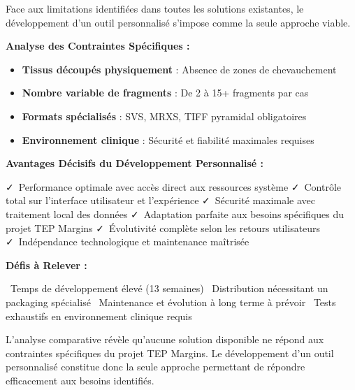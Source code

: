 \documentclass[11pt,a4paper]{report}
\newcommand{\pro}[1]{\textcolor{SuccessGreen}{\faCheck\ #1}}
\newcommand{\con}[1]{\textcolor{DangerRed}{\faTimes\ #1}}
\begin{document}
\begin{tcolorbox}[colback=SuccessGreen!10, colframe=SuccessGreen, title=Développement Personnalisé - Solution Optimale]

Face aux limitations identifiées dans toutes les solutions existantes, le développement d'un outil personnalisé s'impose comme la seule approche viable.

\vspace{0.5cm}

\textbf{Analyse des Contraintes Spécifiques :}
\begin{itemize}[leftmargin=*]
    \item \textbf{Tissus découpés physiquement} : Absence de zones de chevauchement
    \item \textbf{Nombre variable de fragments} : De 2 à 15+ fragments par cas
    \item \textbf{Formats spécialisés} : SVS, MRXS, TIFF pyramidal obligatoires
    \item \textbf{Environnement clinique} : Sécurité et fiabilité maximales requises
\end{itemize}

\vspace{0.5cm}

\textbf{Avantages Décisifs du Développement Personnalisé :}
\begin{itemize}[leftmargin=*]
    \pro{Performance optimale avec accès direct aux ressources système}
    \pro{Contrôle total sur l'interface utilisateur et l'expérience}
    \pro{Sécurité maximale avec traitement local des données}
    \pro{Adaptation parfaite aux besoins spécifiques du projet TEP Margins}
    \pro{Évolutivité complète selon les retours utilisateurs}
    \pro{Indépendance technologique et maintenance maîtrisée}
\end{itemize}

\vspace{0.5cm}

\textbf{Défis à Relever :}
\begin{itemize}[leftmargin=*]
    \con{Temps de développement élevé (13 semaines)}
    \con{Distribution nécessitant un packaging spécialisé}
    \con{Maintenance et évolution à long terme à prévoir}
    \con{Tests exhaustifs en environnement clinique requis}
\end{itemize}

\end{tcolorbox}

L'analyse comparative révèle qu'aucune solution disponible ne répond aux contraintes spécifiques du projet TEP Margins. Le développement d'un outil personnalisé constitue donc la seule approche permettant de répondre efficacement aux besoins identifiés.
\end{document}
